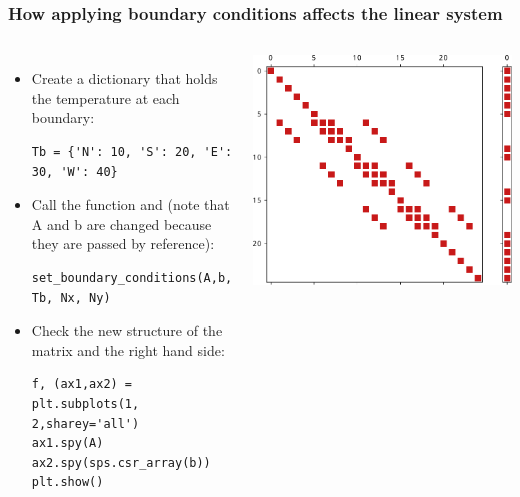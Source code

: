 \begin{frame}[fragile]
  \frametitle{How applying boundary conditions affects the linear system}
  \begin{columns}
      \begin{itemize}
        \item Create a dictionary that holds the temperature at each boundary:
        \begin{lstlisting}
Tb = {'N': 10, 'S': 20, 'E': 30, 'W': 40}
        \end{lstlisting}
        \item Call the function and (note that A and b are changed because they are passed by reference):
        \begin{lstlisting}
set_boundary_conditions(A,b, Tb, Nx, Ny)
        \end{lstlisting}
        \item Check the new structure of the matrix and the right hand side:
        \begin{lstlisting}
f, (ax1,ax2) = plt.subplots(1, 2,sharey='all')
ax1.spy(A)
ax2.spy(sps.csr_array(b))
plt.show()
        \end{lstlisting}
      \end{itemize}
      \includegraphics[width=\columnwidth]{figures/spab.pdf}
  \end{columns}
\end{frame}

